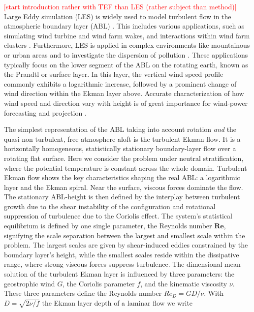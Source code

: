 \documentclass[a4paper,11pt]{article}
\newcommand{\todo}[1]{\textcolor{red}{$[$#1$]$}}
\newcommand{\RE}{\mathbf{Re}}
\begin{document}
\todo{start introduction rather with TEF than LES (rather subject than method)}
Large Eddy simulation (LES) is widely used to model turbulent flow in the atmospheric boundary layer (ABL) \citep{stoll2020large}. This includes various applications, such as simulating wind turbine and wind farm wakes, and interactions within wind farm clusters \citep{porte2011large,mehta2014large,breton2017survey}. Furthermore, LES is applied in complex environments like mountainous or urban areas \citep{stoll2020large,garcia2018predictive} and to investigate the dispersion of pollution \cite{han2018large}. These applications typically focus on the lower segment of the ABL on the rotating earth, known as the Prandtl or surface layer. In this layer, the vertical wind speed profile commonly exhibits a logarithmic increase, followed by a prominent change of wind direction within the Ekman layer above. Accurate characterization of how wind speed and direction vary with height is of great importance for wind-power forecasting and projection \citep{optis2014moving}.

The simplest representation of the ABL taking into account rotation \emph{and} the quasi non-turbulent, free atmosphere aloft is the turbulent Ekman flow. It is a horizontally homogeneous, statistically stationary boundary-layer flow over a rotating flat surface. Here we consider the problem under neutral stratification, where the potential temperature is constant across the whole domain. Turbulent Ekman flow shows the key characteristics shaping the real ABL: a logarithmic layer and the Ekman spiral. Near the surface, viscous forces dominate the flow. The stationary ABL-height is then defined by the interplay between turbulent growth due to the shear instability of the configuration \citep{lilly1966instability} and rotational suppression of turbulence due to the Coriolis effect. The system's statistical equilibrium is defined by one single parameter, the Reynolds number $\RE$, signifying the scale separation between the largest and smallest scale within the problem. The largest scales are given by shear-induced eddies constrained by the boundary layer's height, while the smallest scales reside within the dissipative range, where strong viscous forces suppress turbulence. The dimensional mean solution of the turbulent Ekman layer is influenced by three parameters: the geostrophic wind $G$, the Coriolis parameter $f$, and the kinematic viscosity $\nu$. These three parameters define the Reynolds number $Re_D = GD/\nu$. With $D=\sqrt{2\nu/f}$ the Ekman layer depth of a laminar flow we write
\end{document}
